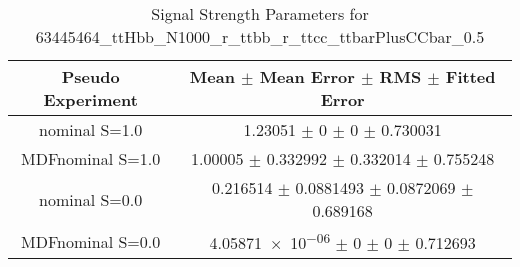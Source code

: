 \begin{table}
\centering
\caption{Signal Strength Parameters for 63445464\_ttHbb\_N1000\_r\_ttbb\_r\_ttcc\_ttbarPlusCCbar\_0.5}
\begin{tabular}{cc}
\toprule
Pseudo Experiment & Mean $\pm$ Mean Error $\pm$ RMS $\pm$ Fitted Error\\
\midrule
nominal S=1.0 & \num{1.23051} $\pm$ \num{0} $\pm$ \num{0} $\pm$ \num{0.730031}\\
MDFnominal S=1.0 & \num{1.00005} $\pm$ \num{0.332992} $\pm$ \num{0.332014} $\pm$ \num{0.755248}\\
nominal S=0.0 & \num{0.216514} $\pm$ \num{0.0881493} $\pm$ \num{0.0872069} $\pm$ \num{0.689168}\\
MDFnominal S=0.0 & \num{4.05871e-06} $\pm$ \num{0} $\pm$ \num{0} $\pm$ \num{0.712693}\\
\bottomrule
\end{tabular}
\end{table}